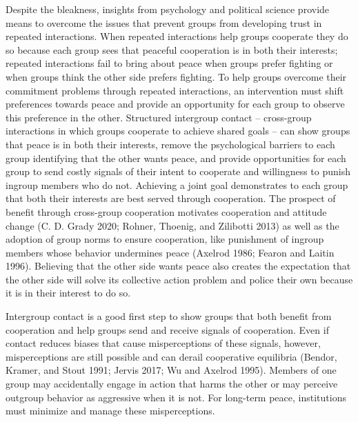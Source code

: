 \documentclass[11pt]{article}
\begin{document}
Despite the bleakness, insights from psychology and political science
provide means to overcome the issues that prevent groups from developing
trust in repeated interactions. When repeated interactions help groups
cooperate they do so because each group sees that peaceful cooperation
is in both their interests; repeated interactions fail to bring about
peace when groups prefer fighting or when groups think the other side
prefers fighting. To help groups overcome their commitment problems
through repeated interactions, an intervention must shift preferences
towards peace and provide an opportunity for each group to observe this
preference in the other. Structured intergroup contact -- cross-group
interactions in which groups cooperate to achieve shared goals -- can
show groups that peace is in both their interests, remove the
psychological barriers to each group identifying that the other wants
peace, and provide opportunities for each group to send costly signals
of their intent to cooperate and willingness to punish ingroup members
who do not. Achieving a joint goal demonstrates to each group that both
their interests are best served through cooperation. The prospect of
benefit through cross-group cooperation motivates cooperation and
attitude change (C. D. Grady 2020; Rohner, Thoenig, and Zilibotti 2013)
as well as the adoption of group norms to ensure cooperation, like
punishment of ingroup members whose behavior undermines peace (Axelrod
1986; Fearon and Laitin 1996). Believing that the other side wants peace
also creates the expectation that the other side will solve its
collective action problem and police their own because it is in their
interest to do so.

Intergroup contact is a good first step to show groups that both benefit
from cooperation and help groups send and receive signals of
cooperation. Even if contact reduces biases that cause misperceptions of
these signals, however, misperceptions are still possible and can derail
cooperative equilibria (Bendor, Kramer, and Stout 1991; Jervis 2017; Wu
and Axelrod 1995). Members of one group may accidentally engage in
action that harms the other or may perceive outgroup behavior as
aggressive when it is not. For long-term peace, institutions must
minimize and manage these misperceptions.
\end{document}
